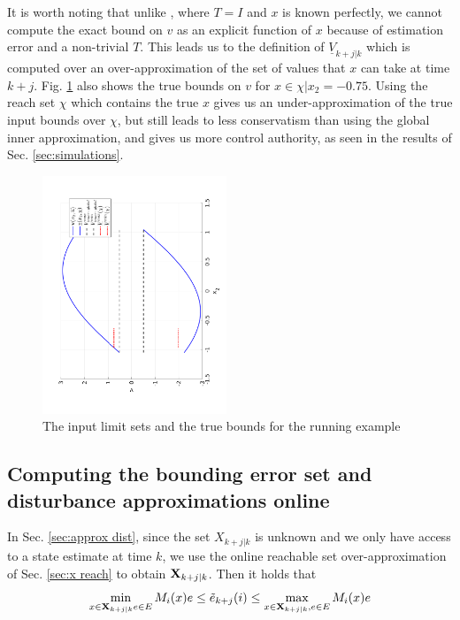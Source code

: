 It is worth noting that unlike \cite{SimonLG13_MPC}, where $T=I$ and $x$ is known perfectly, we cannot compute the exact bound on $v$ as an explicit function of $x$ because of estimation error and a non-trivial $T$. This leads us to the definition of $\underline{V}_{k+j|k}$ which is computed over an over-approximation of the set of values that $x$ can take at time $k+j$. Fig. \ref{fig:inp_toy} also shows the true bounds on $v$ for $x \in \chi | x_2 = -0.75$. Using the reach set $\chi$ which contains the true $x$ gives us an under-approximation of the true input bounds over $\chi$, but still leads to less conservatism than using the global inner approximation, and gives us more control authority, as seen in the results of Sec. \ref{sec:simulations}.

\begin{figure}
\includegraphics[angle=270,width=0.49\textwidth]{figs/InputToy.pdf}
\caption{The input limit sets and the true bounds for the running example}
\label{fig:inp_toy}
\end{figure}


\subsection{Computing the bounding error set and disturbance approximations online}

In Sec. \ref{sec:approx dist}, since the set $X_{k+j|k}$ is unknown and we only have access to a state estimate at time $k$, we use the online reachable set over-approximation of Sec. \ref{sec:x reach} to obtain $\mathbf{X}_{k+j|k}$.
Then it holds that 
\[\min_{x \in \mathbf{X}_{k+j|k} e \in E}M_i(x)e \leq \tilde{e}_{k+j}(i) \leq \max_{x \in \mathbf{X}_{k+j|k}, e \in E} M_i(x)e\]

